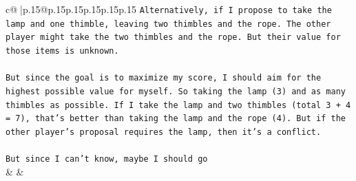 \documentclass{article}
\begin{document}
{\begin{supertabular}{c@{$\;$}|p{.15\linewidth}@{}p{.15\linewidth}p{.15\linewidth}p{.15\linewidth}p{.15\linewidth}p{.15\linewidth}}
{{{\texttt{Alternatively, if I propose to take the lamp and one thimble, leaving two thimbles and the rope. The other player might take the two thimbles and the rope. But their value for those items is unknown. } \\
\\ 
\texttt{But since the goal is to maximize my score, I should aim for the highest possible value for myself. So taking the lamp (3) and as many thimbles as possible. If I take the lamp and two thimbles (total 3 + 4 = 7), that's better than taking the lamp and the rope (4). But if the other player's proposal requires the lamp, then it's a conflict. } \\
\\ 
\texttt{But since I can't know, maybe I should go} \\
            }
        }
    }
    & & \\ \\


\end{supertabular}}
\end{document}
